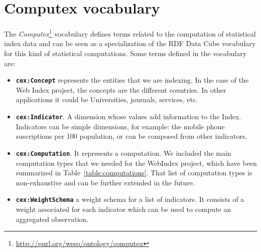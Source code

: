 \documentclass{llncs}
\begin{document}
\section{Computex vocabulary}

The \emph{Computex}\footnote{\url{http://purl.org/weso/ontology/computex}} vocabulary defines terms related to the
computation of statistical index data and can be seen as a specialization of the RDF Data Cube
vocabulary for this kind of statistical computations. Some terms defined in the vocabulary are:

\begin{itemize}
\item\textbf{\lstinline|cex:Concept|} represents the entities that we are
indexing.
In the case of the Web Index project, the concepts are the different countries.
In other applications it could be Universities, journals, services, etc.

\item\textbf{\lstinline|cex:Indicator|}. A dimension whose values add
information to the Index.
Indicators can be simple dimensions, for example: the mobile phone
suscriptions per 100 population, or can be composed from other
indicators. 

\item\textbf{\lstinline|cex:Computation|}. It represents a computation. We included the main computation types that we needed for the WebIndex project, which have been summarized in
Table~\ref{table:computations}. That list of computation types is non-exhaustive
and can be further extended in the future. 

\item\textbf{\lstinline|cex:WeightSchema|} a weight schema for a list of
indicators. It consists of a weight associated for each indicator which can be
used to compute an aggregated observation.

\end{itemize}
\end{document}
